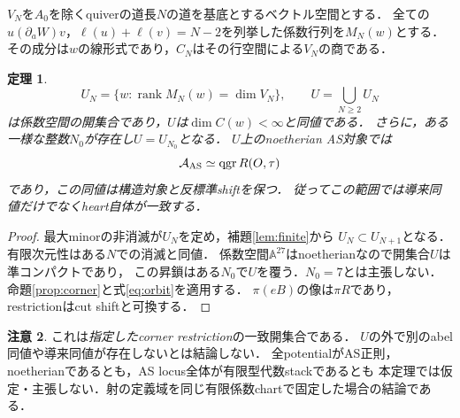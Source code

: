 \documentclass[11pt,a4paper]{ltjsarticle}
\newtheorem{theorem}{定理}[section]
\theoremstyle{definition}\newtheorem{remark}[theorem]{注意}
\DeclareMathOperator{\qgr}{qgr}\DeclareMathOperator{\Hom}{Hom}\DeclareMathOperator{\Ext}{Ext}
\begin{document}
$V_N$を$A_0$を除くquiverの道長$N$の道を基底とするベクトル空間とする．
全ての$u(\partial_aW)v$，$\ell(u)+\ell(v)=N-2$を列挙した係数行列を$M_N(w)$とする．
その成分は$w$の線形式であり，$C_N$はその行空間による$V_N$の商である．
\begin{theorem}\label{thm:open}
\[
 U_N=\{w:\operatorname{rank}M_N(w)=\dim V_N\},\qquad
 U=\bigcup_{N\ge2}U_N
\]
は係数空間の開集合であり，$U$は$\dim C(w)<\infty$と同値である．
さらに，ある一様な整数$N_0$が存在し$U=U_{N_0}$となる．
$U$上のnoetherian AS対象では
\[
 \cA_{\mathrm{AS}}\simeq\qgr R(O,\tau)
\]
であり，この同値は構造対象と反標準shiftを保つ．
従ってこの範囲では導来同値だけでなくheart自体が一致する．
\end{theorem}
\begin{proof}
最大minorの非消滅が$U_N$を定め，補題\ref{lem:finite}から
$U_N\subset U_{N+1}$となる．有限次元性はある$N$での消滅と同値．
係数空間$\mathbb A^{27}$はnoetherianなので開集合$U$は準コンパクトであり，
この昇鎖はある$N_0$で$U$を覆う．$N_0=7$とは主張しない．
命題\ref{prop:corner}と式\eqref{eq:orbit}を適用する．
$\pi(eB)$の像は$\pi R$であり，restrictionはcut shiftと可換する．
\end{proof}

\begin{remark}
これは\emph{指定したcorner restriction}の一致開集合である．
$U$の外で別のabel同値や導来同値が存在しないとは結論しない．
全potentialがAS正則，noetherianであるとも，AS locus全体が有限型代数stackであるとも
本定理では仮定・主張しない．射の定義域を同じ有限係数chartで固定した場合の結論である．
\end{remark}
\end{document}
